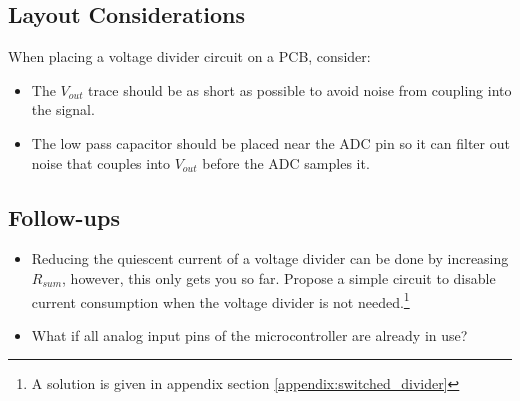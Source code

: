 \documentclass[main.tex]{subfiles}
\begin{document}
\subsection{Layout Considerations}
When placing a voltage divider circuit on a PCB, consider:
\begin{itemize}
    \item The $V_{out}$ trace should be as short as possible to avoid noise from coupling into the signal. 
    \item The low pass capacitor should be placed near the ADC pin so it can filter out noise that couples into $V_{out}$ before the ADC samples it.
\end{itemize}

\subsection{Follow-ups}
\begin{itemize}
    \item Reducing the quiescent current of a voltage divider can be done by increasing $R_{sum}$, however, this only gets you so far. Propose a simple circuit to disable current consumption when the voltage divider is not needed.\footnote{A solution is given in appendix section \ref{appendix:switched_divider}}
    \item What if all analog input pins of the microcontroller are already in use? %
\end{itemize}
\end{document}
